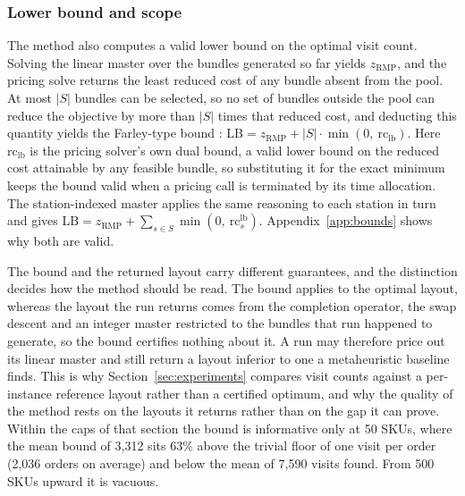 \documentclass[]{interact}
\begin{document}
\subsubsection{Lower bound and scope}\label{sec:cgbound}
The method also computes a valid lower bound on the optimal visit count. Solving the linear master over the bundles generated so far yields $z_{\mathrm{RMP}}$, and the pricing solve returns the least reduced cost of any bundle absent from the pool. At most $|S|$ bundles can be selected, so no set of bundles outside the pool can reduce the objective by more than $|S|$ times that reduced cost, and deducting this quantity yields the Farley-type bound \citep{farley1990note}: $\mathrm{LB} = z_{\mathrm{RMP}} + |S|\cdot \min(0,\ \mathrm{rc}_{\mathrm{lb}})$. Here $\mathrm{rc}_{\mathrm{lb}}$ is the pricing solver's own dual bound, a valid lower bound on the reduced cost attainable by any feasible bundle, so substituting it for the exact minimum keeps the bound valid when a pricing call is terminated by its time allocation. The station-indexed master applies the same reasoning to each station in turn and gives $\mathrm{LB} = z_{\mathrm{RMP}} + \sum_{s \in S} \min(0,\ \mathrm{rc}^{\mathrm{lb}}_s)$. Appendix~\ref{app:bounds} shows why both are valid.

The bound and the returned layout carry different guarantees, and the distinction decides how the method should be read. The bound applies to the optimal layout, whereas the layout the run returns comes from the completion operator, the swap descent and an integer master restricted to the bundles that run happened to generate, so the bound certifies nothing about it. A run may therefore price out its linear master and still return a layout inferior to one a metaheuristic baseline finds. This is why Section~\ref{sec:experiments} compares visit counts against a per-instance reference layout rather than a certified optimum, and why the quality of the method rests on the layouts it returns rather than on the gap it can prove. Within the caps of that section the bound is informative only at 50 SKUs, where the mean bound of 3,312 sits 63\% above the trivial floor of one visit per order (2,036 orders on average) and below the mean of 7,590 visits found. From 500 SKUs upward it is vacuous.
\end{document}
